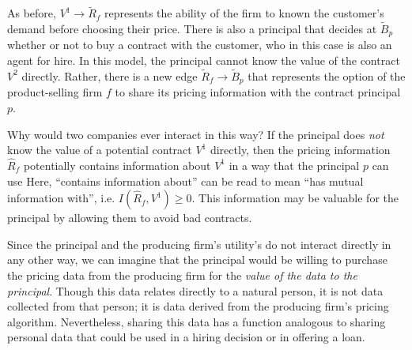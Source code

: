\documentclass[../thesis.tex]{subfiles}
\begin{document}
\begin{center}
\end{center}

As before, $V^1 \rightarrow \tilde{R}_f$ represents the ability of
the firm to known the customer's demand before choosing their
price.
There is also a principal that decides at $\tilde{B}_p$
whether or not to buy a contract with the customer, who
in this case is also an agent for hire.
In this model, the principal cannot know the value
of the contract $V^2$ directly.
Rather, there is a new edge $\tilde{R}_f \rightarrow \tilde{B}_p$
that represents
the option of the product-selling firm $f$ to share its
pricing information with the contract principal $p$.

Why would two companies ever interact in this way?
If the principal does \emph{not} know the value of
a potential contract $V^1$ directly, then the pricing
information $\hat{R}_f$ potentially contains information
about $V^1$ in a way that the principal $p$ can use
Here, ``contains information about'' can be read to
mean ``has mutual information with'', i.e.
$I(\hat{R}_f, V^1) \geq 0$.
This information may be valuable for the principal
by allowing them to avoid bad contracts.

Since the principal and the producing firm's utility's
do not interact directly in any other way, we can
imagine that the principal would be willing to
purchase the pricing data from the producing firm
for the \emph{value of the data to the principal}.
Though this data relates directly to
a natural person, it is not data collected from that
person; it is data derived from the producing firm's
pricing algorithm.
Nevertheless, sharing this data has a function analogous
to sharing personal data that could be used in a hiring decision
or in offering a loan.
\end{document}

